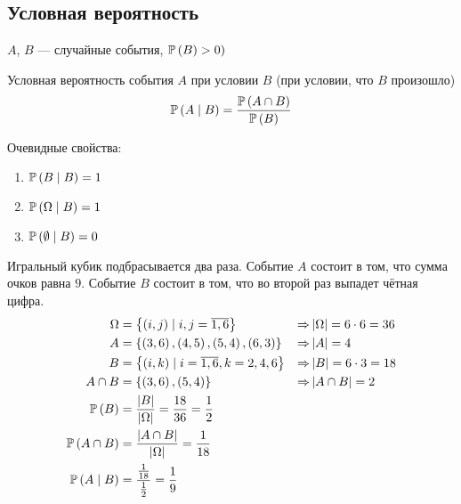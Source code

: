 \chapter{}

\section{Условная вероятность}
$A$, $B$ --- случайные события, $\mathbb{P}\left( B \right)>0)$
\begin{definition}Условная вероятность события $A$ при условии $B$
    (при условии, что $B$ произошло)
    $$\mathbb{P}\left( A\mid B \right)
    =\frac{\mathbb{P}\left(A\cap B\right)}{\mathbb{P}\left( B \right)}$$
\end{definition}
Очевидные свойства:
\begin{enumerate}
    \item $\mathbb{P}\left( B\mid B \right)=1$
    \item $\mathbb{P}\left( \Omega\mid B \right)=1$
    \item $\mathbb{P}\left( \emptyset\mid B \right)=0$
\end{enumerate}

\begin{example}Игральный кубик подбрасывается два раза.
    Событие $A$ состоит в том, что сумма очков равна $9$.
    Событие $B$ состоит в том, что во второй раз выпадет чётная цифра.
    \begin{alignat*}{3}
        \Omega&=\left\{\left(i,j\right)\mid i,j=\overline{1,6}\right\}
        &\Rightarrow&\left|\Omega\right|=6\cdot 6=36\\
        A&=\left\{\left(3,6\right),\left(4,5\right),\left(5,4\right),
            \left(6,3\right)\right\}
        &\Rightarrow&\left|A\right|=4\\
        B&=\left\{\left(i,k\right)\mid i=\overline{1,6}, k=2,4,6\right\}
        &\Rightarrow&\left|B\right|=6\cdot 3=18\\
        A\cap B&=\left\{\left(3,6\right), \left(5,4\right)\right\}
        &\Rightarrow&\left|A\cap B\right|=2\\
        \mathbb{P}\left( B \right)&=\frac{\left|B\right|}{\left|\Omega\right|}
            =\frac{18}{36}=\frac{1}{2}\\
        \mathbb{P}\left( A\cap B \right)&=\frac{\left|A\cap B\right|}{\left|\Omega\right|}
            =\frac{1}{18}\\
        \mathbb{P}\left( A\mid B \right)&=\frac{\frac{1}{18}}{\frac{1}{2}}=\frac{1}{9}\\
    \end{alignat*}

\end{example}
